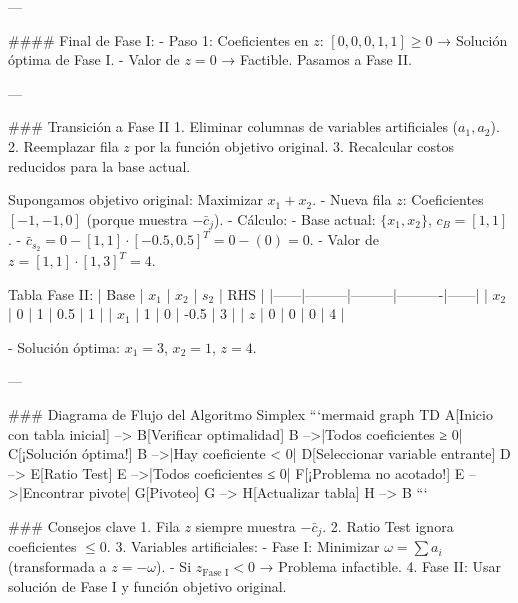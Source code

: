 ---

#### Final de Fase I:
- Paso 1: Coeficientes en \(z\): \([0, 0, 0, 1, 1] \geq 0\) → Solución óptima de Fase I.
- Valor de \(z = 0\) → Factible. Pasamos a Fase II.

---

### Transición a Fase II
1. Eliminar columnas de variables artificiales (\(a_1, a_2\)).
2. Reemplazar fila \(z\) por la función objetivo original.
3. Recalcular costos reducidos para la base actual.

Supongamos objetivo original: Maximizar \(x_1 + x_2\).  
- Nueva fila \(z\): Coeficientes \([-1, -1, 0]\) (porque muestra \(-\bar{c}_j\)).
- Cálculo:
  - Base actual: \(\{x_1, x_2\}\), \(c_B = [1, 1]\).
  - \(\bar{c}_{s_2} = 0 - [1, 1] \cdot [-0.5, 0.5]^T = 0 - (0) = 0\).
  - Valor de \(z = [1, 1] \cdot [1, 3]^T = 4\).

Tabla Fase II:
| Base | \(x_1\) | \(x_2\) | \(s_2\)  | RHS  |
|------|---------|---------|----------|------|
| \(x_2\) | 0       | 1       | 0.5      | 1    |
| \(x_1\) | 1       | 0       | -0.5     | 3    |
| \(z\)  | 0       | 0       | 0        | 4    |

- Solución óptima: \(x_1 = 3\), \(x_2 = 1\), \(z = 4\).

---

### Diagrama de Flujo del Algoritmo Simplex
```mermaid
graph TD
    A[Inicio con tabla inicial] --> B[Verificar optimalidad]
    B -->|Todos coeficientes ≥ 0| C[¡Solución óptima!]
    B -->|Hay coeficiente < 0| D[Seleccionar variable entrante]
    D --> E[Ratio Test]
    E -->|Todos coeficientes ≤ 0| F[¡Problema no acotado!]
    E -->|Encontrar pivote| G[Pivoteo]
    G --> H[Actualizar tabla]
    H --> B
```

### Consejos clave
1. Fila \(z\) siempre muestra \(-\bar{c}_j\).
2. Ratio Test ignora coeficientes \(\leq 0\).
3. Variables artificiales:
   - Fase I: Minimizar \(\omega = \sum a_i\) (transformada a \(z = -\omega\)).
   - Si \(z_{\text{Fase I}} < 0\) → Problema infactible.
4. Fase II: Usar solución de Fase I y función objetivo original.
